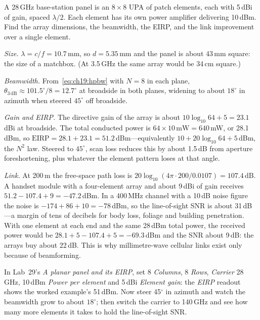 \begin{worked}
A 28\,GHz base-station panel is an $8\times8$ UPA of patch elements, each with 5\,dBi of gain, spaced
$\lambda/2$. Each element has its own power amplifier delivering 10\,dBm. Find the array dimensions,
the beamwidth, the EIRP, and the link improvement over a single element.

\emph{Size.} $\lambda=c/f=10.7$\,mm, so $d=5.35$\,mm and the panel is about 43\,mm square: the
size of a matchbox. (At 3.5\,GHz the same array would be 34\,cm square.)

\emph{Beamwidth.} From~\eqref{eq:ch19:hpbw} with $N=8$ in each plane, $\theta_{3\,\text{dB}}\approx
101.5^\circ/8=12.7^\circ$ at broadside in both planes, widening to about $18^\circ$ in azimuth when
steered $45^\circ$ off broadside.

\emph{Gain and EIRP.} The directive gain of the array is about $10\log_{10}64+5=23.1$\,dBi at
broadside. The total conducted power is $64\times10\,\text{mW}=640$\,mW, or 28.1\,dBm, so
$\text{EIRP}=28.1+23.1=51.2$\,dBm---equivalently $10+20\log_{10}64+5$\,dBm, the $N^2$ law. Steered to
$45^\circ$, scan loss reduces this by about 1.5\,dB from aperture foreshortening, plus whatever the
element pattern loses at that angle.

\emph{Link.} At 200\,m the free-space path loss is $20\log_{10}(4\pi\cdot200/0.0107)=107.4$\,dB. A
handset module with a four-element array and about 9\,dBi of gain receives
$51.2-107.4+9=-47.2$\,dBm. In a 400\,MHz channel with a 10\,dB noise figure the noise is
$-174+86+10=-78$\,dBm, so the line-of-sight SNR is about 31\,dB---a margin of tens of decibels for
body loss, foliage and building penetration. With one element at each end and the same 28\,dBm total
power, the received power would be $28.1+5-107.4+5=-69.3$\,dBm and the SNR about 9\,dB: the arrays
buy about 22\,dB. This is why millimetre-wave cellular links exist only because of beamforming.
\end{worked}


\begin{tryit}
In Lab~29's \emph{A planar panel and its EIRP}, set 8 \emph{Columns}, 8 \emph{Rows}, \emph{Carrier}
28\,GHz, 10\,dBm \emph{Power per element} and 5\,dBi \emph{Element gain}: the \emph{EIRP} readout
shows the worked example's 51\,dBm. Now steer 45$^\circ$ in azimuth and watch the beamwidth grow to
about $18^\circ$; then switch the carrier to 140\,GHz and see how many more elements it takes to
hold the line-of-sight SNR.
\end{tryit}

